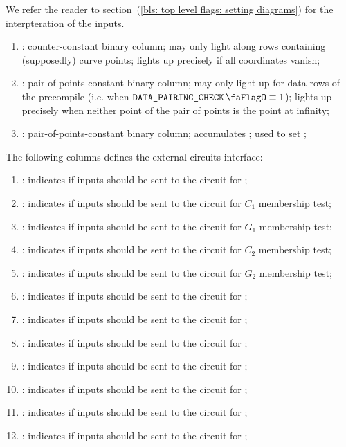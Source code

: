 We refer the reader to section~(\ref{bls: top level flags: setting diagrams}) for the interpteration of the inputs.
\begin{enumerate}[resume]
    \item
        \isInfinity:
        counter-constant binary column;
        may only light along rows containing (supposedly) curve points;
        lights up precisely if all coordinates vanish;
    \item
        \both{\nontrivialPairOfPointsBit}:
        pair-of-points-constant binary column;
        may only light up for data rows of the  precompile (i.e. when $\isBlsPairingCheckData \equiv 1$);
        lights up precisely when neither point of the pair of points is the point at infinity;
    \item
        \both{\nontrivialPairOfPointsAcc}:
        pair-of-points-constant binary column;
        accumulates \nontrivialPairOfPointsBit{};
        used to set \wellformedDataNontrivial{};
\end{enumerate}
The following columns defines the external circuits interface:
\begin{enumerate}[resume]
    \item
        \both{\csPointEvaluation}:
        indicates if inputs should be sent to the circuit for ;
    \item
        \both{\csCOne}:
        indicates if inputs should be sent to the circuit for $C_1$ membership test;
    \item
        \both{\csGOne}:
        indicates if inputs should be sent to the circuit for $G_1$ membership test;
    \item
        \both{\csCTwo}:
        indicates if inputs should be sent to the circuit for $C_2$ membership test;
    \item
        \both{\csGTwo}:
        indicates if inputs should be sent to the circuit for $G_2$ membership test;
    \item
        \both{\csPairing}:
        indicates if inputs should be sent to the circuit for ;
    \item
        \both{\csGOneAdd}:
        indicates if inputs should be sent to the circuit for ;
    \item
        \both{\csGTwoAdd}:
        indicates if inputs should be sent to the circuit for ;
    \item
        \both{\csGOneMsm}:
        indicates if inputs should be sent to the circuit for ;
    \item
        \both{\csGTwoMsm}:
        indicates if inputs should be sent to the circuit for ;
    \item
        \both{\csMapFpToGOne}:
        indicates if inputs should be sent to the circuit for ;
    \item
        \both{\csMapFpTwoToGTwo}:
        indicates if inputs should be sent to the circuit for ;
\end{enumerate}

